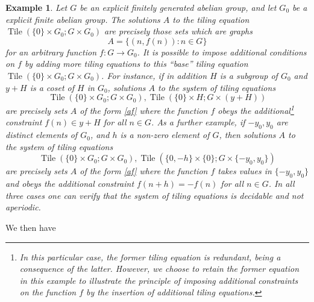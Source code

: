 \documentclass[reqno,a4paper,12pt]{amsart}
\numberwithin{equation}{section}
\numberwithin{figure}{section}
\newcommand{\Tile}{\operatorname{Tile}}
\theoremstyle{plain}
\newtheorem{example}[thm]{Example}
\theoremstyle{definition}
\begin{document}
\begin{example}\label{tilex}  Let $G$ be an explicit finitely generated abelian group, and let $G_0$ be a explicit finite abelian group.  The solutions $A$ to the tiling equation $\Tile(\{0\} \times G_0; G \times G_0)$ are precisely those sets which are graphs
\begin{equation}\label{af}
 A = \{ (n, f(n)) : n \in G \}
 \end{equation}
for an arbitrary function $f \colon G \to G_0$.  It is possible to impose additional conditions on $f$ by adding more tiling equations to this ``base'' tiling equation $\Tile(\{0\} \times G_0; G \times G_0)$.  For instance, if in addition $H$ is a subgroup of $G_0$ and $y+H$ is a coset of $H$ in $G_0$, solutions $A$ to the system of tiling equations
$$ \Tile(\{0\} \times G_0; G \times G_0), \Tile(\{0\} \times H; G \times (y+H))$$
are precisely sets $A$ of the form \eqref{af} where the function $f$ obeys the additional\footnote{In this particular case, the former tiling equation is redundant, being a consequence of the latter. However, we choose to retain the former equation in this example to illustrate the principle of imposing additional constraints on the function $f$ by the insertion of additional tiling equations.} constraint $f(n) \in y+H$ for all $n \in G$.    As a further example, if $-y_0, y_0$ are distinct elements of $G_0$, and $h$ is a non-zero element of $G$, then solutions $A$ to the system of tiling equations
$$ \Tile(\{0\} \times G_0; G \times G_0), \Tile(\{0,-h\} \times \{0\}; G \times \{-y_0,y_0\})$$
are precisely sets $A$ of the form \eqref{af} where the function $f$ takes values in $\{-y_0,y_0\}$ and obeys the additional constraint $f(n+h) = -f(n)$ for all $n \in G$. In all three cases one can verify that the system of tiling equations is decidable and not aperiodic.
\end{example}

We then have
\end{document}
